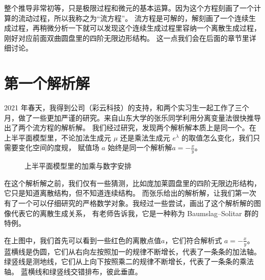\documentclass[a4paper,12pt]{book}
\numberwithin{problem}{section}
\numberwithin{definition}{section}
\numberwithin{lemma}{section}
\numberwithin{proposition}{section}
\numberwithin{theorem}{section}
\numberwithin{grammar}{section}
\numberwithin{program}{section}
\numberwithin{convention}{section}
\numberwithin{corollary}{section}
\begin{document}
整个推导非常初等，只是极限过程和微元的基本运算。因为这个方程刻画了一个计算的流动过程，所以我称之为“流方程”。
流方程是可解的，解刻画了一个连续生成过程，再稍微分析一下就可以发现这个连续生成过程里容纳一个离散生成过程，刚好对应前面双曲圆盘里的四阶无限边形结构。
这一点我们会在后面的章节里详细讨论。

\section{第一个解析解}

2021 年春天，我得到公司（彩云科技）的支持，和两个实习生一起工作了三个月，做了一些更加严谨的研究。来自山东大学的张乐同学利用分离变量法很快推导出了两个流方程的解析解。
我们经过研究，发现两个解析解本质上是同一个。在上半平面模型里，不论加法生成元 $\mu$ 还是乘法生成元 $e^\lambda$ 的取值怎么变化，我们只需要变化空间的度规，
赋值场 $a$ 始终是同一个解析解$a = - \frac{x}{y}$。

\begin{figure}[ht]\centering
{}
\caption{上半平面模型里的加乘与数字安排}\label{fig:assignment1}
\end{figure}

在这个解析解之前，我们仅有一些猜测，比如庞加莱圆盘里的四阶无限边形结构，它只是知道离散结构，但不知道连续结构。
而张乐给出的解析解，让我们第一次有了一个可以仔细研究的严格数学对象。我经过一些尝试，画出了这个解析解的图像代表它的离散生成关系，
有老师告诉我，它是一种称为 Baumslag–Solitar 群的特例。

在上图中，我们首先可以看到一些红色的离散点值$a$，它们符合解析式 $a = -\frac{x}{y}$。
蓝横线是伪圆，它们从右向左按照加一的规律不断增长，代表了一条条的加法轴。 绿竖线是测地线，它们从上向下按照乘二的规律不断增长，代表了一条条的乘法轴。
蓝横线和绿竖线交错排布，彼此垂直。
\end{document}

